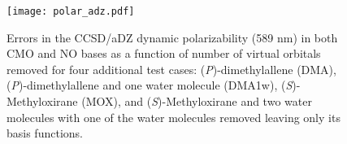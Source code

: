 \begin{figure}
  \centering
  \texttt{[image: polar\_adz.pdf]}
  \caption{Errors in the CCSD/aDZ dynamic polarizability (589
nm) in both CMO and NO bases as a function of number of virtual orbitals
removed for four additional test cases: (\textit{P})-dimethylallene (DMA),
   (\textit{P})-dimethylallene and one water molecule (DMA1w), (\textit{S})-Methyloxirane
(MOX), and (\textit{S})-Methyloxirane and two water molecules with one of the water
molecules removed leaving only its basis functions.}
   \label{fig:polar_adz}
\end{figure}
